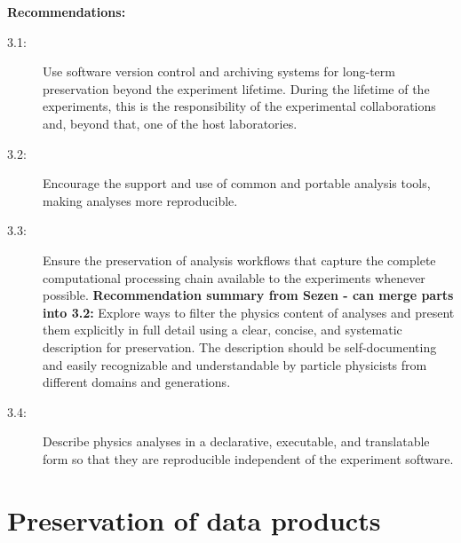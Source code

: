 \documentclass[11pt]{article}
\begin{document}
\noindent
\textbf{Recommendations:}
\begin{description}
   \item[3.1:] Use software version control and archiving systems for long-term preservation beyond the experiment lifetime.
   During the lifetime of the experiments, this is the responsibility of the experimental collaborations and, beyond that, one of the host laboratories.
   \item[3.2:] Encourage the support and use of common and portable analysis tools, making analyses more reproducible.
   \item[3.3:] Ensure the preservation of analysis workflows that capture the complete computational processing chain available to the experiments whenever possible.
   \textbf{Recommendation summary from Sezen - can merge parts into 3.2:} Explore ways to filter the physics content of analyses and present them explicitly in full detail using a clear, concise, and systematic description for preservation. The description should be self-documenting and easily recognizable and understandable by particle physicists from different domains and generations.  
   \item[3.4:] Describe physics analyses in a declarative, executable, and translatable form so that they are reproducible independent of the experiment software.
\end{description}


\section{Preservation of data products}
\label{data-products}
\end{document}
